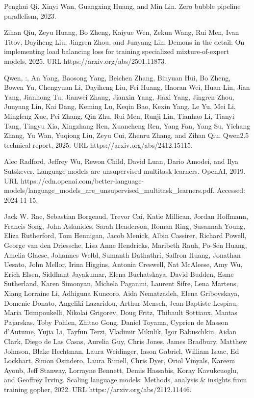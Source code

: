 \documentclass[
  10
]{article}
\begin{document}
Penghui Qi, Xinyi Wan, Guangxing Huang, and Min Lin. Zero bubble
pipeline parallelism, 2023.

Zihan Qiu, Zeyu Huang, Bo Zheng, Kaiyue Wen, Zekun Wang, Rui Men, Ivan
Titov, Dayiheng Liu, Jingren Zhou, and Junyang Lin. Demons in the
detail: On implementing load balancing loss for training specialized
mixture-of-expert models, 2025. URL https://arxiv.org/abs/2501.11873.

Qwen, :, An Yang, Baosong Yang, Beichen Zhang, Binyuan Hui, Bo Zheng,
Bowen Yu, Chengyuan Li, Dayiheng Liu, Fei Huang, Haoran Wei, Huan Lin,
Jian Yang, Jianhong Tu, Jianwei Zhang, Jianxin Yang, Jiaxi Yang, Jingren
Zhou, Junyang Lin, Kai Dang, Keming Lu, Keqin Bao, Kexin Yang, Le Yu,
Mei Li, Mingfeng
Xue, Pei Zhang, Qin Zhu, Rui Men, Runji Lin, Tianhao Li, Tianyi Tang,
Tingyu Xia, Xingzhang Ren, Xuancheng Ren, Yang Fan, Yang Su, Yichang
Zhang, Yu Wan, Yuqiong Liu, Zeyu Cui, Zhenru Zhang, and Zihan Qiu.
Qwen2.5 technical report, 2025. URL https://arxiv.org/abs/2412.15115.

Alec Radford, Jeffrey Wu, Rewon Child, David Luan, Dario Amodei, and Ilya
Sutskever. Language models are unsupervised multitask learners. OpenAI,
2019. URL https://cdn.openai.com/better-language-models/language\_models\_are\_unsupervised\_multitask\_learners.pdf. Accessed: 2024-11-15.

Jack W. Rae, Sebastian Borgeaud, Trevor Cai, Katie Millican, Jordan
Hoffmann, Francis Song, John Aslanides, Sarah Henderson, Roman Ring,
Susannah Young, Eliza Rutherford, Tom Hennigan, Jacob Menick, Albin
Cassirer, Richard Powell, George van den Driessche, Lisa Anne Hendricks,
Maribeth Rauh, Po-Sen Huang, Amelia Glaese, Johannes Welbl, Sumanth
Dathathri, Saffron Huang, Jonathan Uesato, John Mellor, Irina Higgins,
Antonia Creswell, Nat McAleese, Amy Wu, Erich Elsen, Siddhant Jayakumar,
Elena Buchatskaya, David Budden, Esme Sutherland, Karen Simonyan,
Michela Paganini, Laurent Sifre, Lena Martens, Xiang Lorraine Li,
Adhiguna Kuncoro, Aida Nematzadeh, Elena Gribovskaya, Domenic Donato,
Angeliki Lazaridou, Arthur Mensch, Jean-Baptiste Lespiau, Maria
Tsimpoukelli, Nikolai Grigorev, Doug Fritz, Thibault Sottiaux, Mantas
Pajarskas, Toby Pohlen, Zhitao Gong, Daniel Toyama, Cyprien de Masson
d'Autume, Yujia Li, Tayfun Terzi, Vladimir Mikulik, Igor Babuschkin,
Aidan Clark, Diego de Las Casas, Aurelia Guy, Chris Jones, James
Bradbury, Matthew Johnson, Blake Hechtman, Laura Weidinger, Iason
Gabriel, William Isaac, Ed Lockhart, Simon Osindero, Laura Rimell, Chris
Dyer, Oriol Vinyals, Kareem Ayoub, Jeff Stanway, Lorrayne Bennett, Demis
Hassabis, Koray Kavukcuoglu, and Geoffrey Irving. Scaling language
models: Methods, analysis \& insights from training gopher, 2022. URL
https://arxiv.org/abs/2112.11446.
\end{document}
